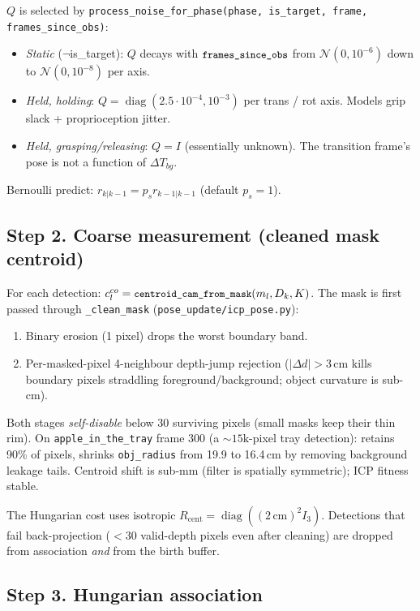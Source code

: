 \documentclass[11pt]{article}
\newcommand{\Norm}{\mathcal{N}}
\newcommand{\code}[1]{\texttt{\small #1}}
\begin{document}
$Q$ is selected by
\code{process\_noise\_for\_phase(phase, is\_target, frame, frames\_since\_obs)}:
\begin{itemize}[leftmargin=1.5em,itemsep=0pt,topsep=2pt]
\item \emph{Static} ($\neg$is\_target): $Q$ decays with $\code{frames\_since\_obs}$ from
   $\Norm(0,10^{-6})$ down to $\Norm(0,10^{-8})$ per axis.
\item \emph{Held, holding}: $Q\!=\!\operatorname{diag}(2.5\!\cdot\!10^{-4},10^{-3})$
   per trans / rot axis. Models grip slack + proprioception jitter.
\item \emph{Held, grasping/releasing}: $Q\!=\!I$ (essentially unknown).
   The transition frame's pose is not a function of $\Delta T_{bg}$.
\end{itemize}
Bernoulli predict: $r_{k|k-1}=p_s r_{k-1|k-1}$ (default $p_s=1$).

\subsection{Step 2. Coarse measurement (cleaned mask centroid)}\label{sec:coarse}

For each detection: $c^{co}_l=\code{centroid\_cam\_from\_mask}(m_l,D_k,K)$.
The mask is first passed through \code{\_clean\_mask}
(\code{pose\_update/icp\_pose.py}):
\begin{enumerate}[leftmargin=1.5em,itemsep=0pt,topsep=2pt]
\item Binary erosion (1 pixel) drops the worst boundary band.
\item Per-masked-pixel 4-neighbour depth-jump rejection
   ($|\Delta d|\!>\!3\,\text{cm}$ kills boundary pixels straddling
   foreground/background; object curvature is sub-cm).
\end{enumerate}
Both stages \emph{self-disable} below 30 surviving pixels (small masks
keep their thin rim). On \code{apple\_in\_the\_tray} frame 300 (a
$\sim\!15\text{k}$-pixel tray detection): retains 90\% of pixels,
shrinks \code{obj\_radius} from 19.9 to 16.4\,cm by removing background
leakage tails. Centroid shift is sub-mm (filter is spatially symmetric);
ICP fitness stable.

The Hungarian cost uses isotropic $R_{\text{cent}}=\operatorname{diag}((2\,\text{cm})^2 I_3)$.
Detections that fail back-projection ($<\!30$ valid-depth pixels even
after cleaning) are dropped from association \emph{and} from the birth
buffer.

\subsection{Step 3. Hungarian association}\label{sec:assoc}
\end{document}
